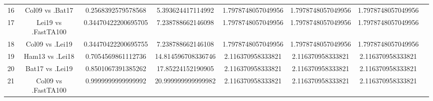 \documentclass[a4paper,10pt]{article}
\begin{document}
\begin{landscape}
\begin{table}[!htp]
\begin{tabular}{cccccccc}
16&Col09 vs .Bat17&0.2568392579578568&5.393624417114992&1.7978748057049956&1.7978748057049956&1.7978748057049956\\
17&Lei19 vs .FastTA100&0.34470422200695705&7.238788662146098&1.7978748057049956&1.7978748057049956&1.7978748057049956\\
18&Col09 vs .Lei19&0.34470422200695755&7.238788662146108&1.7978748057049956&1.7978748057049956&1.7978748057049956\\
19&Ham13 vs .Lei18&0.7054569861112736&14.814596708336746&2.116370958333821&2.116370958333821&2.116370958333821\\
20&Bat17 vs .Lei19&0.8501067391385262&17.85224152190905&2.116370958333821&2.116370958333821&2.116370958333821\\
21&Col09 vs .FastTA100&0.9999999999999992&20.999999999999982&2.116370958333821&2.116370958333821&2.116370958333821\\
\hline
\end{tabular}
\end{table}

\end{landscape}
\end{document}
